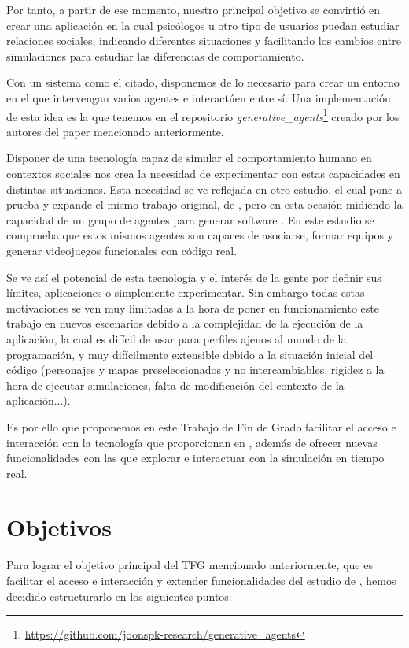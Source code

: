 Por tanto, a partir de ese momento, nuestro principal objetivo se convirtió en crear una aplicación en la cual psicólogos u otro tipo de usuarios puedan estudiar relaciones sociales, indicando diferentes situaciones y facilitando los cambios entre simulaciones para estudiar las diferencias de comportamiento.

Con un sistema como el citado, disponemos de lo necesario para crear un entorno en el que intervengan varios agentes e interactúen entre sí. Una implementación de esta idea es la que tenemos en el repositorio {\textit{generative\_agents}}\footnote{\url{https://github.com/joonspk-research/generative_agents}} creado por los autores del paper mencionado anteriormente.

Disponer de una tecnología capaz de simular el comportamiento humano en contextos sociales nos crea la necesidad de experimentar con estas capacidades en distintas situaciones. Esta necesidad se ve reflejada en otro estudio, el cual pone a prueba y expande el mismo trabajo original, de \cite{park2023generative}, pero en esta ocasión midiendo la capacidad de un grupo de agentes para generar software \citep{qian2023communicative}. En este estudio se comprueba que estos mismos agentes son capaces de asociarse, formar equipos y generar videojuegos funcionales con código real.

Se ve así el potencial de esta tecnología y el interés de la gente por definir sus límites, aplicaciones o simplemente experimentar. Sin embargo todas estas motivaciones se ven muy limitadas a la hora de poner en funcionamiento este trabajo en nuevos escenarios debido a la complejidad de la ejecución de la aplicación, la cual es difícil de usar para perfiles ajenos al mundo de la programación, y muy difícilmente extensible debido a la situación inicial del código (personajes y mapas preseleccionados y no intercambiables, rigidez a la hora de ejecutar simulaciones, falta de modificación del contexto de la aplicación...).

Es por ello que proponemos en este Trabajo de Fin de Grado facilitar el acceso e interacción con la tecnología que proporcionan en \ga, además de ofrecer nuevas funcionalidades con las que explorar e interactuar con la simulación en tiempo real.

\section{Objetivos}

Para lograr el objetivo principal del TFG mencionado anteriormente, que es facilitar el acceso e interacción y extender funcionalidades del estudio de  \ga, hemos decidido estructurarlo en los siguientes puntos:

